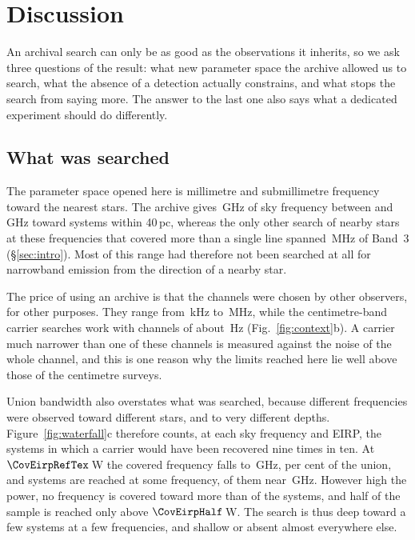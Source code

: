 \section{Discussion}
\label{sec:discussion}

An archival search can only be as good as the observations it inherits, so
we ask three questions of the result: what new parameter space
the archive allowed us to search, what the absence of a detection actually
constrains, and what stops the search from saying more. The answer to the
last one also says what a dedicated experiment should do differently.

\subsection{What was searched}
\label{sec:newspace}

The parameter space opened here is millimetre and submillimetre frequency
toward the nearest stars. The archive gives \CvUnionA\,GHz of sky frequency
between \SurvFreqLoA{} and \SurvFreqHiA\,GHz toward systems within 40\,pc,
whereas the only other search of nearby stars at these frequencies that
covered more than a single line spanned \MasonBandMHz\,MHz of Band~3
(\S\ref{sec:intro}). Most of this range had therefore not been searched at
all for narrowband emission from the direction of a nearby star.

The price of using an archive is that the channels were chosen by other
observers, for other purposes. They range from \SzChanFinestKHz\,kHz to
\SzChanWidestMHz\,MHz, while the centimetre-band carrier searches work with
channels of about \SzChanLitHz\,Hz (Fig.~\ref{fig:context}b). A carrier much
narrower than one of these channels is measured against the noise of the
whole channel, and this is one reason why the limits reached here lie well
above those of the centimetre surveys.

Union bandwidth also overstates what was searched, because different
frequencies were observed toward different stars, and to very different
depths. Figure~\ref{fig:waterfall}c therefore counts, at each sky frequency
and EIRP, the systems in which a carrier would have been recovered nine times
in ten. At $\CovEirpRefTex$\,W the covered frequency falls to
\CovUnionAtRef\,GHz, \CovFracAtRef{} per cent of the union, and
\CovNSysAtRef{} systems are reached at some frequency, \CovNMaxAtRef{} of them
near \CovNuMaxAtRef\,GHz. However high the power, no frequency is covered
toward more than \CovNMaxFull{} of the \NSysClassA{} systems, and half of the
sample is
reached only above $\CovEirpHalf$\,W. The search is thus deep toward a few
systems at a few frequencies, and shallow or absent almost everywhere else.

